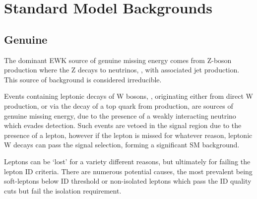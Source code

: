 
\section{Standard Model Backgrounds}
\subsection{Genuine \met}
The dominant EWK source of genuine missing energy comes from Z-boson 
production where the Z decays
to neutrinos, \zinv, with associated jet production. This source of background
is considered irreducible.

Events containing leptonic decays of W bosons, \wlnu, originating either
from direct W production, or via the decay of a top quark from \ttbar 
production, are sources of genuine 
missing energy, due to the presence of a weakly interacting neutrino which
evades detection. Such events are vetoed in the signal
region due to the presence of a 
lepton, however if the lepton is missed for whatever reason, leptonic W decays 
can pass the signal selection, forming a significant SM background.


Leptons can be `lost' for a variety different reasons, but ultimately for failing
the lepton ID criteria. There are numerous potential causes, the 
most prevalent being soft-leptons below ID threshold or non-isolated leptons 
which pass the ID quality cuts but fail the isolation requirement.



